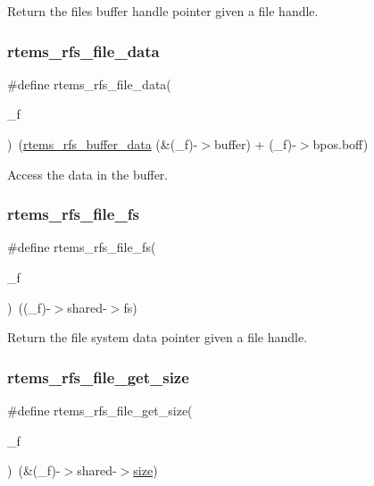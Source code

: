 Return the file\textquotesingle{}s buffer handle pointer given a file handle. \mbox{\label{rtems-rfs-file_8h_afe557c4a6812ce29a1c43640b51f561e}} 
\subsubsection{\texorpdfstring{rtems\_rfs\_file\_data}{rtems\_rfs\_file\_data}}
{\footnotesize\ttfamily \#define rtems\+\_\+rfs\+\_\+file\+\_\+data(\begin{DoxyParamCaption}\item[{}]{\+\_\+f }\end{DoxyParamCaption})~(\mbox{\hyperlink{rtems-rfs-buffer_8h_aeb8816b42da7435346c907b381188402}{rtems\+\_\+rfs\+\_\+buffer\+\_\+data}} (\&(\+\_\+f)-\/$>$buffer) + (\+\_\+f)-\/$>$bpos.\+boff)}

Access the data in the buffer. \mbox{\label{rtems-rfs-file_8h_a4c7546d9fdb507dcd132e994a235242a}} 
\subsubsection{\texorpdfstring{rtems\_rfs\_file\_fs}{rtems\_rfs\_file\_fs}}
{\footnotesize\ttfamily \#define rtems\+\_\+rfs\+\_\+file\+\_\+fs(\begin{DoxyParamCaption}\item[{}]{\+\_\+f }\end{DoxyParamCaption})~((\+\_\+f)-\/$>$shared-\/$>$fs)}

Return the file system data pointer given a file handle. \mbox{\label{rtems-rfs-file_8h_aff48c478d0897c80730e1d64782004cb}} 
\subsubsection{\texorpdfstring{rtems\_rfs\_file\_get\_size}{rtems\_rfs\_file\_get\_size}}
{\footnotesize\ttfamily \#define rtems\+\_\+rfs\+\_\+file\+\_\+get\+\_\+size(\begin{DoxyParamCaption}\item[{}]{\+\_\+f }\end{DoxyParamCaption})~(\&(\+\_\+f)-\/$>$shared-\/$>$\mbox{\hyperlink{sun4u_2tte_8h_a245260f6f74972558f61b85227df5aae}{size}})}

